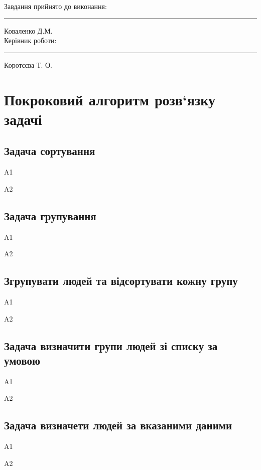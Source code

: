 \documentclass[oneside,14pt]{extarticle}
\begin{document}
Завдання прийнято до виконання: \rule{4cm}{0.15mm} Коваленко Д.М.\\
Керівник роботи: \rule{4cm}{0.15mm} Коротєєва Т. О.

\section{Покроковий алгоритм розв‘язку задачі}
\subsection{Задача сортування}
\begin{list}{}{Алгоритм A.}
	\item [A1] 
	\item [A2] 
\end{list}

\subsection{Задача групування}
\begin{list}{}{Алгоритм A.}
	\item [A1] 
	\item [A2] 
\end{list}

\subsection{Згрупувати людей та відсортувати кожну групу}
\begin{list}{}{Алгоритм A.}
	\item [A1] 
	\item [A2] 
\end{list}

\subsection{Задача визначити групи людей зі списку за умовою}
\begin{list}{}{Алгоритм A.}
	\item [A1] 
	\item [A2] 
\end{list}

\subsection{Задача визначети людей за вказаними даними}
\begin{list}{}{Алгоритм A.}
	\item [A1] 
	\item [A2] 
\end{list}
\end{document}

